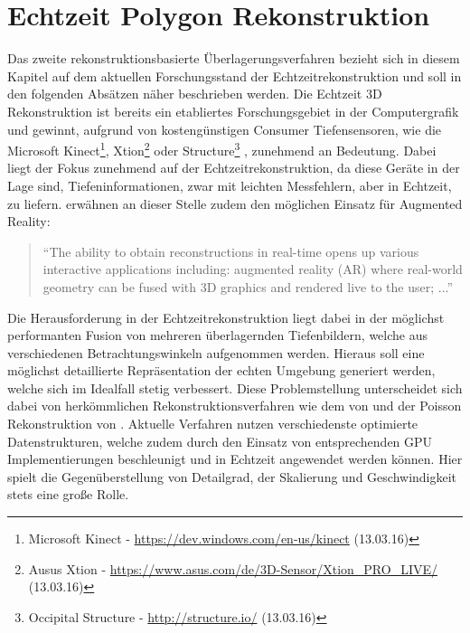 \section{Echtzeit Polygon Rekonstruktion} \label{sec:polygon_reconstruction}

Das zweite rekonstruktionsbasierte Überlagerungsverfahren bezieht sich in diesem Kapitel auf dem aktuellen Forschungsstand der Echtzeitrekonstruktion und soll in den folgenden Absätzen näher beschrieben werden. Die Echtzeit 3D Rekonstruktion ist bereits ein etabliertes Forschungsgebiet in der Computergrafik und gewinnt, aufgrund von kostengünstigen Consumer Tiefensensoren, wie die Microsoft Kinect\footnote{Microsoft Kinect - \url{https://dev.windows.com/en-us/kinect} (13.03.16)}, Xtion\footnote{Ausus Xtion - \url{https://www.asus.com/de/3D-Sensor/Xtion_PRO_LIVE/} (13.03.16)} oder Structure\footnote{Occipital Structure - \url{http://structure.io/} (13.03.16)} , zunehmend an Bedeutung. Dabei liegt der Fokus zunehmend auf der Echtzeitrekonstruktion, da diese Geräte in der Lage sind, Tiefeninformationen, zwar mit leichten Messfehlern, aber in Echtzeit, zu liefern. \citet{niessner2013real} erwähnen an dieser Stelle zudem den möglichen Einsatz für Augmented Reality:

\begin{quote}
\enquote{The ability to obtain reconstructions
in real-time opens up various interactive applications including:
augmented reality (AR) where real-world geometry can be fused
with 3D graphics and rendered live to the user; ...} \citep{niessner2013real}
\end{quote}

Die Herausforderung in der Echtzeitrekonstruktion liegt dabei in der möglichst performanten Fusion von mehreren überlagernden Tiefenbildern, welche aus verschiedenen Betrachtungswinkeln aufgenommen werden. Hieraus soll eine möglichst detaillierte Repräsentation der echten Umgebung generiert werden, welche sich im Idealfall stetig verbessert. Diese Problemstellung unterscheidet sich dabei von herkömmlichen Rekonstruktionsverfahren wie dem von \citet{hoppe1992surface} und der Poisson Rekonstruktion von \citet{kazhdan2006poisson}. Aktuelle Verfahren nutzen verschiedenste optimierte Datenstrukturen, welche zudem durch den Einsatz von entsprechenden GPU Implementierungen beschleunigt und in Echtzeit angewendet werden können. Hier spielt die Gegenüberstellung von Detailgrad, der Skalierung und Geschwindigkeit stets eine große Rolle. \citep{niessner2013real} 

